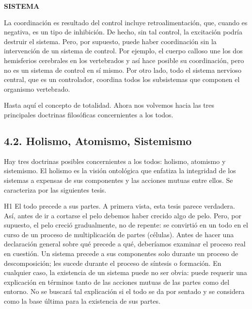 \newpage
\fancyhf{}
\fancyhead[r]{\thepage}
\begin{center}
{\fontsize{13}{16}\selectfont \textbf{SISTEMA}}
\end{center}
\vspace{0.5cm}

{\fontsize{13}{15}\selectfont
La coordinación es resultado del control incluye retroalimentación, que, cuando es negativa, es un tipo de inhibición. De hecho, sin tal control, la excitación podría destruir el sistema. 
Pero, por supuesto, puede haber coordinación sin la intervención de un sistema de control. Por ejemplo, el cuerpo calloso une los dos hemisferios cerebrales en los vertebrados y así hace posible su coordinación, pero no es un sistema de control en sí mismo. 
Por otro lado, todo el sistema nervioso central, que es un controlador, coordina todos los subsistemas que componen el organismo vertebrado.

Hasta aquí el concepto de totalidad. Ahora nos volvemos hacia las tres principales doctrinas filosóficas concernientes a los todos.

\subsection* {4.2. Holismo, Atomismo, Sistemismo}

Hay tres doctrinas posibles concernientes a los todos: holismo, atomismo y sistemismo. El holismo es la visión ontológica que enfatiza la integridad de los sistemas a expensas de sus componentes y las acciones mutuas entre ellos. 
Se caracteriza por las siguientes tesis.

H1 El todo precede a sus partes. A primera vista, esta tesis parece verdadera. Así, antes de ir a cortarse el pelo debemos haber crecido algo de pelo. 
Pero, por supuesto, el pelo creció gradualmente, no de repente: se convirtió en un todo en el curso de un proceso de multiplicación de partes (células). Antes de hacer una declaración general sobre qué precede a qué, deberíamos examinar el proceso real en cuestión. 
Un sistema precede a sus componentes solo durante un proceso de descomposición; les sucede durante el proceso de síntesis o formación. En cualquier caso, la existencia de un sistema puede no ser obvia: puede requerir una explicación en términos tanto de las acciones mutuas de las partes como del entorno. No se buscará tal explicación si el todo se da por sentado y se considera como la base última para la existencia de sus partes.

}
